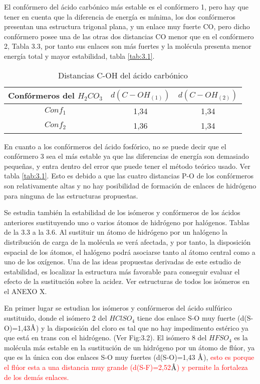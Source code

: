 El confórmero del ácido carbónico más estable es el confórmero 1, pero hay que tener en cuenta que la diferencia de energía es mínima, los dos confórmeros presentan una estructura trigonal plana, y un enlace muy fuerte CO, pero dicho confórmero posee una de las otras dos distancias CO menor que en el confórmero 2, Tabla 3.3, por tanto sus enlaces son más fuertes y la molécula presenta menor energía total y mayor estabilidad, tabla \ref{tab:3.1}. 
\begin{table}[H]
    \centering
    \begin{tabular}{|c|c|c|}
    \hline
    Confórmeros del $H_2CO_3$ & $d(C-OH_{(1)})$ & $d(C-OH_{(2)})$ \\ \hline
    $Conf_1$ & 1,34 & 1,34  \\ \hline
    $Conf_2$ & 1,36 & 1,34 \\ \hline 
    \end{tabular}
    \caption{Distancias C-OH del ácido carbónico}
\end{table}

En cuanto a los confórmeros del ácido fosfórico, no se puede decir que el confórmero 3 sea el más estable ya que las diferencias de energía son demasiado pequeñas, y entra dentro del error que puede tener el método teórico usado. Ver tabla \ref{tab:3.1}. Esto es debido a que las cuatro distancias P-O de los confórmeros son relativamente altas y no hay posibilidad de formación de enlaces de hidrógeno para ninguna de las estructuras propuestas.

Se estudia también la estabilidad de los isómeros y confórmeros de los ácidos anteriores sustituyendo uno o varios átomos de hidrógeno por halógenos. Tablas de la 3.3 a la 3.6. Al sustituir un átomo de hidrógeno por un halógeno la distribución de carga de la molécula se verá afectada, y por tanto, la disposición espacial de los átomos, el halógeno podrá asociarse tanto al átomo central como a uno de los oxígenos. Una de las ideas propuestas derivadas de este estudio de  estabilidad, es localizar la estructura más favorable para conseguir evaluar el efecto de la sustitución sobre la acidez. Ver estructuras de todos los isómeros en el ANEXO X.

En primer lugar se estudian los isómeros y confórmeros del ácido sulfúrico sustituido, donde el isómero 2 del $HClSO_4$ tiene dos enlace S-O muy fuerte (d(S-O)=1,43$\mbox{\normalfont\AA}$) y la disposición del cloro es tal que no hay impedimento estérico ya que está en trans con el hidrógeno. (Ver Fig:3.2). El isómero 8 del $HFSO_4$ es la molécula más estable en la sustitución de un hidrógeno por un átomo de flúor, ya que es la única con dos enlaces S-O muy fuertes (d(S-O)=1,43 $\mbox{\normalfont\AA}$), \textcolor{red} {esto es porque el flúor esta a una distancia muy grande (d(S-F)=2,52$\mbox{\normalfont\AA}$) y permite la fortaleza de los demás enlaces.}

